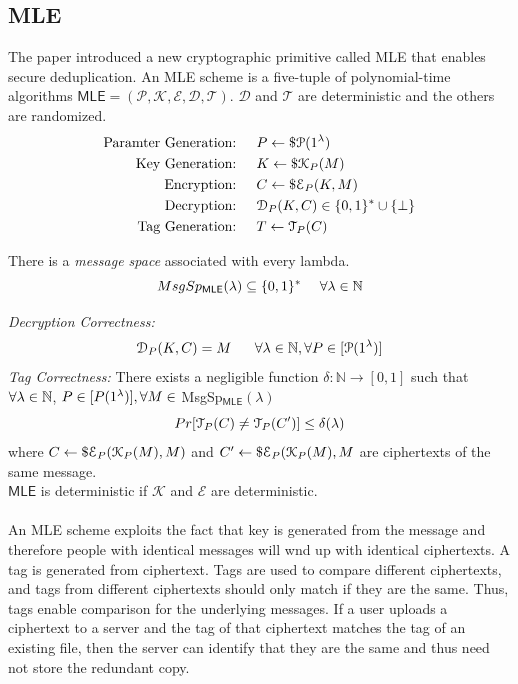 \subsection{MLE}    
The paper \cite{mle} introduced a new cryptographic primitive called MLE that 
enables secure deduplication.
An MLE scheme is a five-tuple of polynomial-time algorithms $\mathsf{MLE}=(\mathcal{P,K,E,D,T})$.
$\mathcal{D}$ and $\mathcal{T}$ are deterministic and the others are randomized.
\begin{displaymath}
\begin{aligned}
\text{Paramter Generation: \ \ \ } & P  \leftarrow \$ \mathcal{P}(1^{\lambda}) \\
\text{Key Generation: \ \ \ } & K  \leftarrow \$ \mathcal{K}_P(M) \\
\text{Encryption: \ \ \ } & C \leftarrow \$ \mathcal{E}_P (K,M) \\
\text{Decryption: \ \ \ } & \mathcal{D}_P (K,C) \in \{0,1\}^* \cup \{ \bot \} \\
\text{Tag Generation: \ \ \ } & T \leftarrow \mathcal{T}_P(C)
\end{aligned}
\end{displaymath}

There is a \textit{message space} associated with every lambda. 
\begin{equation}
\notag
MsgSp_{\mathsf{MLE}}(\lambda) \subseteq \{0,1\}^* \ \ \ \  \forall \lambda \in \mathbb{N}
\end{equation}	

\textit{Decryption Correctness: }
\begin{equation}
\notag
\mathcal{D}_P(K,C) = M\ \ \ \ \  \forall \lambda \in \mathbb{N} , \forall P \in [\mathcal{P}(1^\lambda)]
\end{equation}
\textit{Tag Correctness: } There exists a negligible function $\delta : \mathbb{N} \rightarrow [0,1]$ such that
$\forall \lambda \in \mathbb{N}$, $P \in [P(1^{\lambda})], \forall M \in$ MsgSp$_\mathsf{MLE}(\lambda)$
\begin{equation}
\notag
Pr[\mathcal{T}_P(C) \neq \mathcal{T}_P(C')] \leq \delta (\lambda)
\end{equation}
where $C \leftarrow \$ \mathcal{E}_P (\mathcal{K}_P(M),M) $ and $C' \leftarrow \$ \mathcal{E}_P (\mathcal{K}_P(M),M $ 
are ciphertexts of the same message.
\\
$\mathsf{MLE}$ is deterministic if $\mathcal{K}$ and $\mathcal{E}$ are deterministic. \\ \\
An MLE scheme exploits the fact that key is generated from the message and therefore people with identical messages will wnd up with identical ciphertexts. A tag is generated from ciphertext. Tags are used to compare different ciphertexts, and tags from different ciphertexts should only match if they are the same. Thus, tags enable comparison for the underlying messages. If a user uploads a ciphertext to a server and the tag of that ciphertext matches the tag of an existing file, then the server can identify that they are the same and thus need not store the redundant copy.

